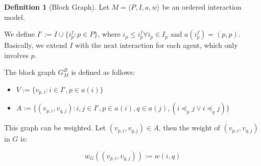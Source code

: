 \documentclass[a4paper,11pt]{book}
\theoremstyle{definition}
\newtheorem{definition}{Definition}
\begin{document}
\begin{definition}[Block Graph]
    Let $M = \langle P, I, a, w \rangle$ be an ordered interaction model. 

    We define $I' := I \cup \{i^f_p : p \in P\}$, where $i_p \leq i^f_p \forall i_p \in I_p$ and $a(i^f_p) = (p,p)$.
    Basically, we extend $I$ with the next interaction for each agent, which only involves $p$.
    
    The block graph $G^B_{M}$ is defined as follows:

    \begin{itemize}
        \item $V := \{ v_{p, i} : i \in I', p \in a(i) \}$\\
        \item $A := \{ (v_{p,i}, v_{q,j}) : i, j \in I', p \in a(i), q \in a(j), (i \preceq_p j \vee i \preceq_q j) \}$\\
    \end{itemize}

    This graph can be weighted. Let $(v_{p,i}, v_{q, j}) \in A$, then the weight of $(v_{p,i}, v_{q, j})$ in
    $G$ is:

    \begin{equation*}
        w_G((v_{p,i}, v_{q, j})) := w(i, q)
    \end{equation*}
    \label{def:block_graph}
\end{definition}
\end{document}
